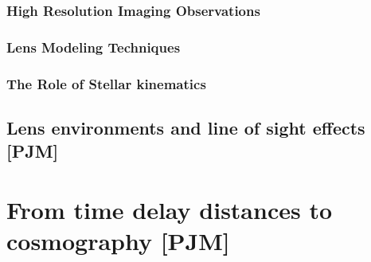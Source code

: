 

\subsubsection{High Resolution Imaging Observations}




\subsubsection{Lens Modeling Techniques}





\subsubsection{The Role of Stellar kinematics}


\subsection{Lens environments and line of sight effects [PJM]}
\label{sec:measurement:los}





\section{From time delay distances to cosmography [PJM]}
\label{sec:cosmo}

